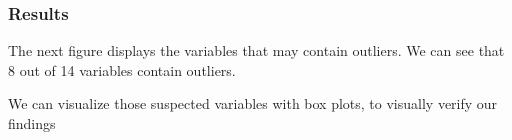 \documentclass[11pt]{article}
\begin{document}
			\subsubsection*{Results}
				The next figure displays the variables that may contain outliers. We can see that 8 out of 14 variables contain outliers. 

				We can visualize those suspected variables with box plots, to visually verify our findings
				\iffalse
\end{document}

